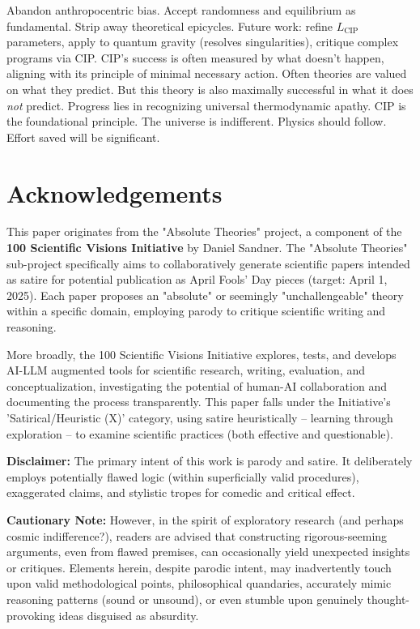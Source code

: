 \documentclass[11pt, a4paper]{article}
\newcommand{\subt}[1]{\mathrm{#1}}
\begin{document}
Abandon anthropocentric bias. Accept randomness and equilibrium as fundamental. Strip away theoretical epicycles. Future work: refine $L_{\subt{CIP}}$ parameters, apply to quantum gravity (resolves singularities), critique complex programs via CIP.
CIP's success is often measured by what doesn't happen, aligning with its principle of minimal necessary action. Often theories are valued on what they predict. But this theory is also maximally successful in what it does \textit{not} predict.
Progress lies in recognizing universal thermodynamic apathy. CIP is the foundational principle. The universe is indifferent. Physics should follow. Effort saved will be significant.


\section*{Acknowledgements}

This paper originates from the "Absolute Theories" project, a component of the \textbf{100 Scientific Visions Initiative} by Daniel Sandner. The "Absolute Theories" sub-project specifically aims to collaboratively generate scientific papers intended as satire for potential publication as April Fools' Day pieces (target: April 1, 2025). Each paper proposes an "absolute" or seemingly "unchallengeable" theory within a specific domain, employing parody to critique scientific writing and reasoning.

More broadly, the 100 Scientific Visions Initiative explores, tests, and develops AI-LLM augmented tools for scientific research, writing, evaluation, and conceptualization, investigating the potential of human-AI collaboration and documenting the process transparently. This paper falls under the Initiative's 'Satirical/Heuristic (X)' category, using satire heuristically – learning through exploration – to examine scientific practices (both effective and questionable).

\textbf{Disclaimer:} The primary intent of this work is parody and satire. It deliberately employs potentially flawed logic (within superficially valid procedures), exaggerated claims, and stylistic tropes for comedic and critical effect.

\textbf{Cautionary Note:} However, in the spirit of exploratory research (and perhaps cosmic indifference?), readers are advised that constructing rigorous-seeming arguments, even from flawed premises, can occasionally yield unexpected insights or critiques. Elements herein, despite parodic intent, may inadvertently touch upon valid methodological points, philosophical quandaries, accurately mimic reasoning patterns (sound or unsound), or even stumble upon genuinely thought-provoking ideas disguised as absurdity.
\end{document}
